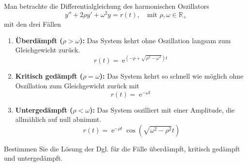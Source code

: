 {
Man betrachte die Differentialgleichung des harmonischen Oszillators
\[
y'' + 2\rho y' + \omega^2 y = r(t), \quad \text{mit } \rho, \omega \in \mathbb R_+
\]
mit den drei Fällen
\begin{enumerate}
  \item \textbf{Überdämpft (\( \rho > \omega \)):} Das System kehrt ohne Oszillation langsam zum Gleichgewicht zurück.
  $$
  r(t) = \operatorname{e}^{(-\rho + \sqrt{\rho^2 - \omega^2})t}
  $$
  \item \textbf{Kritisch gedämpft (\( \rho = \omega \)):} Das System kehrt so schnell wie möglich ohne Oszillation zum Gleichgewicht zurück mit
  $$
  r(t) = \operatorname{e}^{-\omega t}
  $$
  \item \textbf{Untergedämpft (\( \rho < \omega \)):} Das System oszilliert mit einer Amplitude, die allmählich auf null abnimmt.
  $$
  r(t) = \operatorname{e}^{-\rho t} \cos(\sqrt{\omega^2 - \rho^2}t)
  $$
\end{enumerate}
Bestimmen Sie die Lösung der Dgl. für die Fälle überdämpft, kritisch gedämpft und untergedämpft.
}


